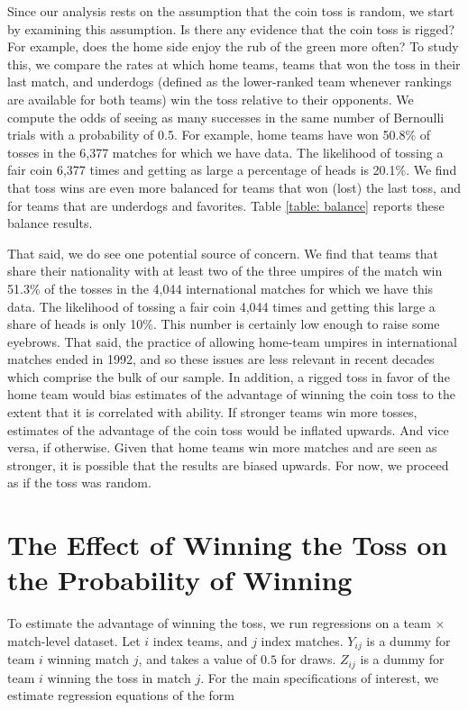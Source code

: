 \documentclass[12pt, letterpaper]{article}
\begin{document}
Since our analysis rests on the assumption that the coin toss is random, we start by examining this assumption. Is there any evidence that the coin toss is rigged? For example, does the home side enjoy the rub of the green more often? To study this, we compare the rates at which home teams, teams that won the toss in their last match, and underdogs (defined as the lower-ranked team whenever rankings are available for both teams) win the toss relative to their opponents. We compute the odds of seeing as many successes in the same number of Bernoulli trials with a probability of 0.5. For example, home teams have won 50.8\% of tosses in the 6,377 matches for which we have data. The likelihood of tossing a fair coin 6,377 times and getting as large a percentage of heads is 20.1\%. We find that toss wins are even more balanced for teams that won (lost) the last toss, and for teams that are underdogs and favorites. Table \ref{table: balance} reports these balance results. 

That said, we do see one potential source of concern. We find that teams that share their nationality with at least two of the three umpires of the match win 51.3\% of the tosses in the 4,044 international matches for which we have this data. The likelihood of tossing a fair coin 4,044 times and getting this large a share of heads is only 10\%. This number is certainly low enough to raise some eyebrows. That said, the practice of allowing home-team umpires in international matches ended in 1992, and so these issues are less relevant in recent decades which comprise the bulk of our sample. In addition, a rigged toss in favor of the home team would bias estimates of the advantage of winning the coin toss to the extent that it is correlated with ability. If stronger teams win more tosses, estimates of the advantage of the coin toss would be inflated upwards. And vice versa, if otherwise. Given that home teams win more matches and are seen as stronger, it is possible that the results are biased upwards. For now, we proceed as if the toss was random.

\section{The Effect of Winning the Toss on the Probability of Winning}

To estimate the advantage of winning the toss, we run regressions on a team $\times$ match-level dataset. Let $i$ index teams, and $j$ index matches. $Y_{ij}$ is a dummy for team $i$ winning match $j$, and takes a value of $0.5$ for draws. $Z_{ij}$ is a dummy for team $i$ winning the toss in match $j$. For the main specifications of interest, we estimate regression equations of the form
\end{document}
